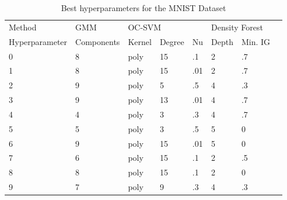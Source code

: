 \documentclass[10pt]{article}
\begin{document}
\begin{table}[H]
    \centering
    \begin{tabular}{@{}llllllll@{}}
    \toprule
    Method & \gls{GMM} & \multicolumn{3}{l}{OC-SVM} & \multicolumn{3}{l}{Density Forest} \\ 
    Hyperparameter & Components & Kernel & Degree & Nu & Depth & Min. IG \\\midrule
    0 & 8 & poly & 15 & .1  & 2 & .7  \\
    1 & 8 & poly & 15 & .01 & 2 & .7  \\
    2 & 9 & poly & 5  & .5  & 4 & .3  \\
    3 & 9 & poly & 13 & .01 & 4 & .7  \\
    4 & 4 & poly & 3  & .3  & 4 & .7  \\
    5 & 5 & poly & 3  & .5  & 5 &  0  \\
    6 & 9 & poly & 15 & .01 & 5 &  0  \\
    7 & 6 & poly & 15 & .1  & 2 & .5  \\
    8 & 8 & poly & 15 & .1  & 2 & 0   \\
    9 & 7 & poly & 9  & .3  & 4 & .3  \\ \bottomrule
    \end{tabular}
    \caption{Best hyperparameters for the MNIST Dataset}
    \label{table:hyperparameters-results-mnist}
\end{table}
\end{document}
